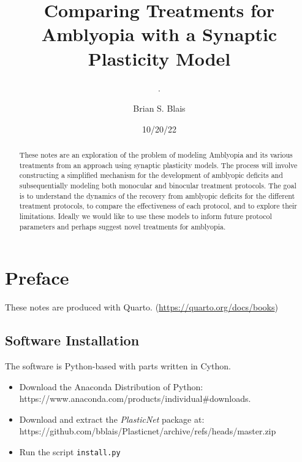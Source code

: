 \documentclass[
  letterpaper,
  DIV=11,
  numbers=noendperiod]{scrreprt}
\title{Comparing Treatments for Amblyopia with a Synaptic Plasticity
Model}
\subtitle{.}
\author{Brian S. Blais}
\date{10/20/22}
\providecommand{\tightlist}{%
  \setlength{\itemsep}{0pt}\setlength{\parskip}{0pt}}\usepackage{longtable,booktabs,array}
\renewcommand*\contentsname{Table of contents}
\newcommand\contentsname{Table of contents}
\begin{document}
\maketitle
\begin{abstract}
These notes are an exploration of the problem of modeling Amblyopia and
its various treatments from an approach using synaptic plasticity
models. The process will involve constructing a simplified mechanism for
the development of amblyopic deficits and subsequentially modeling both
monocular and binocular treatment protocols. The goal is to understand
the dynamics of the recovery from amblyopic deficits for the different
treatment protocols, to compare the effectiveness of each protocol, and
to explore their limitations. Ideally we would like to use these models
to inform future protocol parameters and perhaps suggest novel
treatments for amblyopia.
\end{abstract}
\ifdefined\Shaded\renewenvironment{Shaded}{\begin{tcolorbox}[enhanced, sharp corners, interior hidden, breakable, borderline west={3pt}{0pt}{shadecolor}, boxrule=0pt, frame hidden]}{\end{tcolorbox}}\fi

\renewcommand*\contentsname{Table of contents}
{
\hypersetup{linkcolor=}
\setcounter{tocdepth}{2}
\tableofcontents
}

\hypertarget{preface}{%
\chapter*{Preface}\label{preface}}

These notes are produced with Quarto.
(\url{https://quarto.org/docs/books})

\hypertarget{software-installation}{%
\section*{Software Installation}\label{software-installation}}

The software is Python-based with parts written in Cython.

\begin{itemize}
\tightlist
\item
  Download the Anaconda Distribution of Python:
  https://www.anaconda.com/products/individual\#downloads.\\
\item
  Download and extract the \emph{PlasticNet} package at:
  https://github.com/bblais/Plasticnet/archive/refs/heads/master.zip
\item
  Run the script \texttt{install.py}
\end{itemize}
\end{document}
